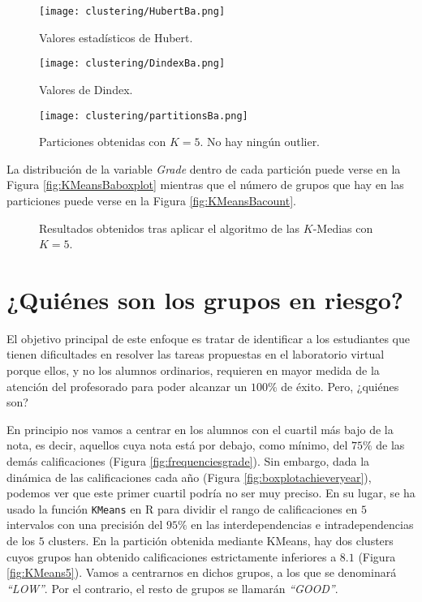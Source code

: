 \begin{figure}[H]
    \centering
    \texttt{[image: clustering/HubertBa.png]}
    \caption{Valores estadísticos de Hubert.}
    \label{fig:indiceshubertBa}
\end{figure}

\begin{figure}[H]
    \centering
    \texttt{[image: clustering/DindexBa.png]}
    \caption{Valores de Dindex.}
    \label{fig:indicesdindexBa}
\end{figure}

\begin{figure}[H]
    \centering
    \texttt{[image: clustering/partitionsBa.png]}
    \caption{Particiones obtenidas con $K = 5$. No hay ningún outlier.}
    \label{fig:KMeansBa}
\end{figure}

La distribución de la variable \emph{Grade} dentro de cada partición puede verse en la Figura \ref{fig:KMeansBaboxplot} mientras que el número de grupos que hay en las particiones puede verse en la Figura \ref{fig:KMeansBacount}.

\begin{figure}[H]
\centering
{}\qquad
{}%
\caption{Resultados obtenidos tras aplicar el algoritmo de las $K$-Medias con $K = 5$.}
\label{fig:KMeansLAPdetails}
\end{figure}

\section{¿Quiénes son los grupos en riesgo?}\label{sec:badstudents}

El objetivo principal de este enfoque es tratar de identificar a los estudiantes que tienen dificultades en resolver las tareas propuestas en el laboratorio virtual porque ellos, y no los alumnos ordinarios, requieren en mayor medida de la atención del profesorado para poder alcanzar un $100\%$ de éxito. Pero, ¿quiénes son?

En principio nos vamos a centrar en los alumnos con el cuartil más bajo de la nota, es decir, aquellos cuya nota está por debajo, como mínimo, del $75\%$ de las demás calificaciones (Figura \ref{fig:frequenciesgrade}). Sin embargo, dada la dinámica de las calificaciones cada año (Figura \ref{fig:boxplotachieveryear}), podemos ver que este primer cuartil podría no ser muy preciso. En su lugar, se ha usado la función \texttt{KMeans} en R para dividir el rango de calificaciones en $5$ intervalos con una precisión del $95\%$ en las interdependencias e intradependencias de los $5$ clusters. En la partición obtenida mediante KMeans, hay dos clusters cuyos grupos han obtenido calificaciones estrictamente inferiores a $8.1$ (Figura \ref{fig:KMeans5}). Vamos a centrarnos en dichos grupos, a los que se denominará \emph{``LOW''}. Por el contrario, el resto de grupos se llamarán \emph{``GOOD''}.

